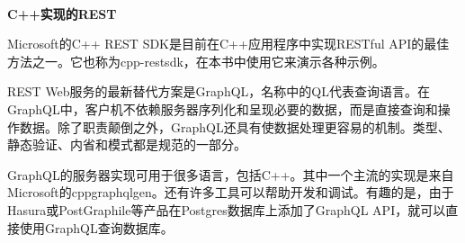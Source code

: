 \hspace*{\fill} \\ %
\noindent
\textbf{C++实现的REST}

Microsoft的C++ REST SDK是目前在C++应用程序中实现RESTful API的最佳方法之一。它也称为cpp-restsdk，在本书中使用它来演示各种示例。


REST Web服务的最新替代方案是GraphQL，名称中的QL代表查询语言。在GraphQL中，客户机不依赖服务器序列化和呈现必要的数据，而是直接查询和操作数据。除了职责颠倒之外，GraphQL还具有使数据处理更容易的机制。类型、静态验证、内省和模式都是规范的一部分。

GraphQL的服务器实现可用于很多语言，包括C++。其中一个主流的实现是来自Microsoft的cppgraphqlgen。还有许多工具可以帮助开发和调试。有趣的是，由于Hasura或PostGraphile等产品在Postgres数据库上添加了GraphQL API，就可以直接使用GraphQL查询数据库。














